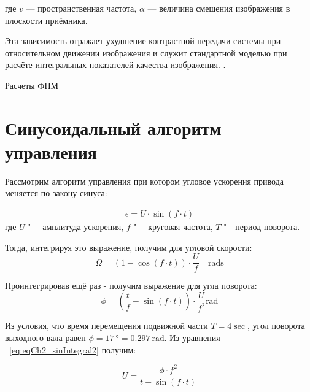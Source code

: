 где \(v\) --- пространственная частота, \(\alpha\) --- величина смещения изображения в плоскости приёмника.

Эта зависимость отражает ухудшение контрастной передачи системы при относительном движении изображения и служит стандартной моделью при расчёте интегральных показателей качества изображения. \cite{pratt2007digital}.

Расчеты ФПМ 



\section{Синусоидальный алгоритм управления}\label{sec:ch2/sec1}

Рассмотрим алгоритм управления при котором угловое ускорения привода меняется по закону синуса:

\begin{samepage}
	\begin{equation}
		\label{eq:eqCh2_sin}
		\begin{aligned}
			\epsilon = U \cdot \sin(f \cdot t)
		\end{aligned}	
	\end{equation}
	где \( U \) "--- амплитуда ускорения, \( f \) "--- круговая частота, \( T \) "---период поворота.
\end{samepage}
	
Тогда, интегрируя это выражение, получим для угловой скорости:
\begin{equation}
	\label{eq:eqCh2_sinIntegral}
	\Omega = \left(1 - \cos\left(f \cdot t\right)\right) \cdot \frac{U}{f} \quad \si{\radian\second}
\end{equation}

Проинтегрировав ещё раз - получим выражение для угла поворота:
\begin{equation}
	\label{eq:eqCh2_sinIntegral2}
	\phi = \left( \frac{t}{f} - \sin\left(f \cdot t\right) \right) \cdot \frac{U}{f^2} \si{\radian}
\end{equation}

Из условия, что время перемещения подвижной части $T = 4 \si{\sec}$, угол поворота выходного вала равен $\phi = \SI{17}{\degree} = \SI{0.297}{\radian}$.
Из уравнения ~\cref{eq:eqCh2_sinIntegral2} получим:

\begin{equation}
	\label{eq:eqCh2_Uacc}
	U = \frac{\phi \cdot f^2}{t - \sin(f \cdot t)}
\end{equation}

